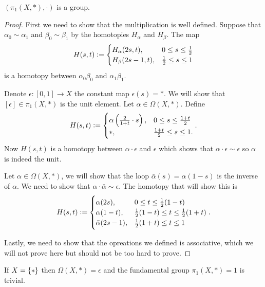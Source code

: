 \documentclass[11pt,a4paper]{article}
\begin{document}
\begin{proposition}
  $(\pi_1(X,*), \cdot)$ is a group.
\end{proposition}
\begin{proof}
  First we need to show that the multiplication is well defined.
  Suppose that $\alpha_0 \sim \alpha_1$ and $\beta_0 \sim \beta_1$
  by the homotopies $H_{\alpha}$ and $H_{\beta}$.
  The map
  \[
    H(s,t) :=
    \begin{cases}
      H_{\alpha}(2s,t), & 0 \le s \le \frac{1}{2} \\
      H_{\beta}(2s - 1,t), & \frac{1}{2} \le s \le 1
    \end{cases}
  \]
  is a homotopy between $\alpha_0 \beta_0$ and $\alpha_1 \beta_1$.

  Denote $\epsilon \colon [0,1] \to X$ the constant map $\epsilon(s) = *$.
  We will show that $[\epsilon] \in \pi_1(X,*)$ is the unit element.
  Let $\alpha \in \Omega(X,*)$.
  Define
  \[
    H(s,t) :=
    \begin{cases}
      \alpha\del{\frac{2}{1 + t} \cdot s}, & 0 \le s \le \frac{1+t}{2} \\
      *, & \frac{1+t}{2} \le s \le 1.
    \end{cases}.
  \]
  Now $H(s,t)$ is a homotopy between $\alpha \cdot \epsilon$ and $\epsilon$
  which shows that $\alpha \cdot \epsilon \sim \epsilon$ so $\alpha$
  is indeed the unit.

  Let $\alpha \in \Omega(X,*)$,
  we will show that the loop $\bar \alpha(s) = \alpha(1 - s)$ is the inverse
  of $\alpha$.
  We need to show that $\alpha \cdot \bar \alpha \sim \epsilon$.
  The homotopy that will show this is
  \[
    H(s,t) :=
    \begin{cases}
      \alpha(2s), & 0 \le t \le \frac{1}{2} (1-t) \\
      \alpha(1-t), & \frac{1}{2} (1-t) \le t \le \frac{1}{2} (1+t) \\
      \bar \alpha(2s - 1), & \frac{1}{2} (1+t) \le t \le 1
    \end{cases}.
  \]

  Lastly, we need to show that the opreations we defined is associative,
  which we will not prove here but should not be too hard to prove.
\end{proof}

\begin{example}
  If $X = \left\{*\right\}$ then $\Omega(X,*) = \epsilon$ and the fundamental
  group $\pi_1(X,*) = 1$ is trivial.
\end{example}
\end{document}
